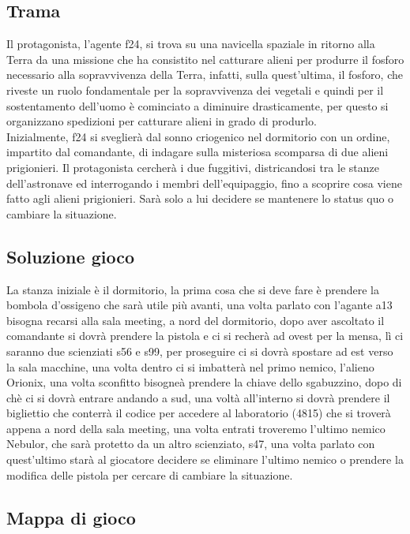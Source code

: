 \documentclass[italian,12pt,a4paper]{article}
\begin{document}
	\subsection{Trama}
		Il protagonista, l’agente f24, si trova su una navicella spaziale in ritorno alla Terra da una missione che ha consistito nel catturare alieni per produrre il fosforo necessario alla sopravvivenza della Terra, infatti, sulla quest'ultima, il fosforo, che riveste un ruolo fondamentale per la sopravvivenza dei vegetali e quindi per il sostentamento dell’uomo è cominciato a diminuire drasticamente, per questo si organizzano spedizioni per catturare alieni in grado di produrlo. \\
		\linebreak
		Inizialmente, f24 si sveglierà dal sonno criogenico nel dormitorio con un ordine, impartito dal comandante, di indagare sulla misteriosa scomparsa di due alieni prigionieri. Il protagonista cercherà i due fuggitivi, districandosi tra le stanze dell’astronave ed interrogando i membri dell’equipaggio, fino a scoprire cosa viene fatto agli alieni prigionieri. Sarà solo a lui decidere se mantenere lo status quo o cambiare la situazione.
	\subsection{Soluzione gioco}
	
		La stanza iniziale è il dormitorio, la prima cosa che si deve fare è prendere la bombola d'ossigeno che sarà utile più avanti, una volta parlato con l'agante a13 bisogna recarsi alla sala meeting, a nord del dormitorio, dopo aver ascoltato il comandante si dovrà prendere la pistola e ci si recherà ad ovest per la mensa, lì ci saranno due scienziati s56 e s99, per proseguire ci si dovrà spostare ad est verso la sala macchine, una volta dentro ci si imbatterà nel primo nemico, l'alieno Orionix, una volta sconfitto bisogneà prendere la chiave dello sgabuzzino, dopo di chè ci si dovrà entrare andando a sud, una voltà all'interno si dovrà prendere il bigliettio che conterrà il codice per accedere al laboratorio (4815) che si troverà appena a nord della sala meeting, una volta entrati troveremo l'ultimo nemico Nebulor, che sarà protetto da un altro scienziato, s47, una volta parlato con quest'ultimo starà al giocatore decidere se eliminare l'ultimo nemico o prendere la modifica delle pistola per cercare di cambiare la situazione.
		
		\subsection{Mappa di gioco}
		
\end{document}
